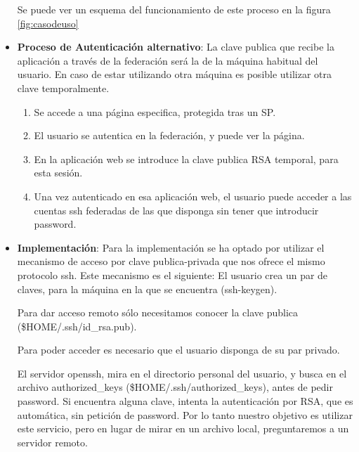 \begin{itemize}
\begin{enumerate}
    \end{enumerate}

    Se puede ver un esquema del funcionamiento de este proceso en la figura
    \ref{fig:casodeuso}

    \item \textbf{Proceso de Autenticación alternativo}:
    La clave publica que recibe la aplicación a través de la federación
    será la de la máquina habitual del usuario. En caso de estar utilizando
    otra máquina es posible utilizar otra clave temporalmente.

    \begin{enumerate}

        \item Se accede a una página especifica, protegida tras un SP.

        \item El usuario se autentica en la federación, y puede ver la página.

        \item En la aplicación web se introduce la clave publica RSA temporal,
        para esta sesión.

        \item Una vez autenticado en esa aplicación web, el usuario puede
        acceder a las cuentas ssh federadas de las que disponga sin tener que
        introducir password.

    \end{enumerate}

    \item \textbf{Implementación}:
    Para la implementación se ha optado por utilizar el mecanismo de acceso
    por clave publica-privada que nos ofrece el mismo protocolo ssh.
    Este mecanismo es el siguiente:
    El usuario crea un par de claves, para la máquina en la que se
    encuentra (ssh-keygen).

    Para dar acceso remoto sólo necesitamos conocer la clave publica
    (\$HOME/.ssh/id\_rsa.pub).
    
    Para poder acceder es necesario que el usuario disponga de su par
    privado.
    
    El servidor openssh, mira en el directorio personal del usuario, y
    busca en el archivo authorized\_keys (\$HOME/.ssh/authorized\_keys), antes
    de pedir password. Si encuentra alguna clave, intenta la autenticación
    por RSA, que es automática, sin petición de password. Por lo tanto
    nuestro objetivo es utilizar este servicio, pero en lugar de mirar en
    un archivo local, preguntaremos a un servidor remoto.
    

\end{itemize}
